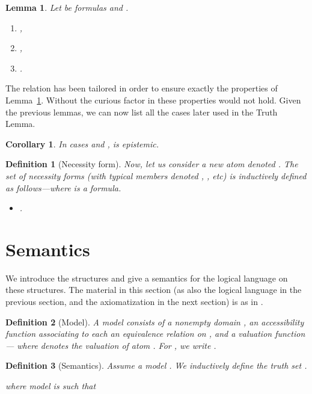 \documentclass{article}[12pt]
\newtheorem{lemma}{Lemma}
\newtheorem{corollary}{Corollary}
\newtheorem{definition}{Definition}
\begin{document}
\begin{lemma}\label{lem_2}
Let  be formulas and .
\begin{enumerate}
\item ,
\item ,
\item .
\end{enumerate}
\end{lemma}

The relation  has been tailored in order to ensure exactly the properties of Lemma~\ref{lem_2}.
Without the curious factor  in  these properties would not hold.
Given the previous lemmas, we can now list all the cases later used in the Truth Lemma.
\begin{corollary} In cases  and ,  is epistemic.

\end{corollary}
\begin{definition}[Necessity form]
Now, let us consider a new atom denoted .
The set  of {\em necessity forms} (with typical members denoted , , etc) is inductively defined as follows---where  is a formula.
\begin{itemize}
\item .
\end{itemize}
\end{definition}
\section{Semantics}


We introduce the structures and give a semantics for the logical language on these structures. The material in this section (as also the logical language in the previous section, and the axiomatization in the next section) is as in \cite{balbianietal:2008}.

\begin{definition}[Model] \label{def.model}
A model  consists of a nonempty {\em domain} , an {\em accessibility function}  associating to each  an equivalence relation  on , and a {\em valuation function}  --- where  denotes the valuation of atom .
For , we write .
\end{definition}

\begin{definition}[Semantics]
Assume a model . We inductively define the truth set .
 
where model  is such that 
\end{definition} 
\end{document}
